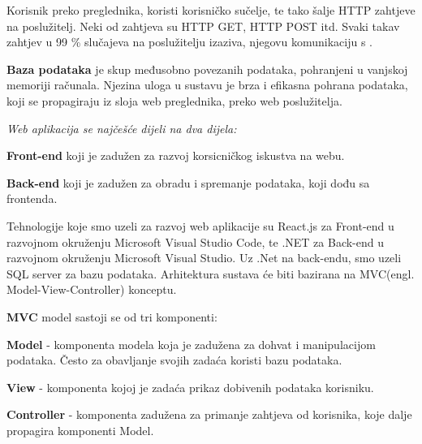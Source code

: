                                 Korisnik preko preglednika, koristi korisničko sučelje, te tako šalje HTTP zahtjeve na poslužitelj. Neki od zahtjeva su HTTP GET, HTTP POST 
                                itd. Svaki takav zahtjev u 99 \% slučajeva na poslužitelju izaziva, njegovu komunikaciju s .

                  \textbf{Baza podataka} je skup međusobno povezanih podataka, pohranjeni u vanjskoj memoriji računala. Njezina uloga u sustavu je brza i efikasna
                                 pohrana podataka, koji se propagiraju iz sloja web preglednika, preko web poslužitelja.

                  \textit{Web aplikacija se najčešće dijeli na dva dijela: }

                               \begin{packed_item}
              			 \item  \textbf{Front-end} koji je zadužen za razvoj korsicničkog iskustva na webu.
                		\item    \textbf{Back-end} koji je zadužen za obradu i spremanje podataka, koji dođu sa frontenda.

              		       \end{packed_item}

                                Tehnologije koje smo uzeli za razvoj web aplikacije su React.js za Front-end u razvojnom okruženju Microsoft Visual Studio Code, te .NET za Back-end u razvojnom okruženju Microsoft Visual Studio.
                                Uz .Net na back-endu, smo uzeli SQL server za bazu podataka. 
                                Arhitektura sustava će biti bazirana na MVC(engl. Model-View-Controller) konceptu.

                      \textbf{MVC} model sastoji se od tri komponenti: 
                                  
                               \begin{packed_item}
             			  \item \textbf{Model} -  komponenta modela koja je zadužena za dohvat i manipulacijom podataka. Često za obavljanje svojih zadaća koristi bazu podataka.
                		  \item  \textbf{View} -   komponenta kojoj je zadaća prikaz dobivenih podataka korisniku.
               		           \item  \textbf{Controller} - komponenta zadužena za primanje zahtjeva od korisnika, koje dalje propagira komponenti Model.

                                \end{packed_item}
                  
